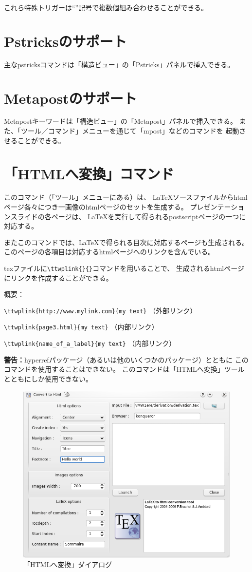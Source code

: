 これら特殊トリガーは``\textbar{}''記号で複数個組み合わせることができる。

\section{Pstricksのサポート}

主なpstricksコマンドは「構造ビュー」の「Pstricks」パネルで挿入できる。

\section{Metapostのサポート}

Metapostキーワードは「構造ビュー」の「Metapost」パネルで挿入できる。
また、「ツール／コマンド」メニューを通じて「mpost」などのコマンドを
起動させることができる。

\section{「HTMLへ変換」コマンド}

このコマンド（「ツール」メニューにある）は、
LaTeXソースファイルからhtmlページ各々につき一画像のhtmlページのセットを生成する。
プレゼンテーションスライドの各ページは、
LaTeXを実行して得られるpostscriptページの一つに対応する。

またこのコマンドでは、LaTeXで得られる目次に対応するページも生成される。
このページの各項目は対応するhtmlページへのリンクを含んでいる。

texファイルに\verb+\ttwplink{}{}+コマンドを用いることで、
生成されるhtmlページにリンクを作成することができる。

概要：

\verb+\ttwplink{http://www.mylink.com}{my text}+ （外部リンク）

\verb+\ttwplink{page3.html}{my text}+ （内部リンク）

\verb+\ttwplink{name_of_a_label}{my text}+ （内部リンク）

\textbf{警告：}hyperrefパッケージ（あるいは他のいくつかのパッケージ）とともに
このコマンドを使用することはできない。
このコマンドは「HTMLへ変換」ツールとともにしか使用できない。

\begin{figure}[H]
  \centering
  \includegraphics[width=.8\linewidth]{doc18.png}
  \caption{「HTMLへ変換」ダイアログ}
\end{figure}

